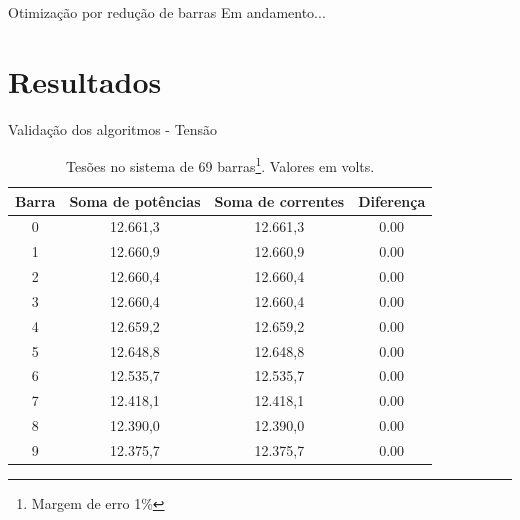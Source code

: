 \documentclass[10pt]{beamer}
\begin{document}
\begin{frame}{Otimização por redução de barras}
    Em andamento...
\end{frame}

\section{Resultados}

\begin{frame}{Validação dos algoritmos - Tensão}
    \begin{table}
        \caption{Tesões no sistema de 69 barras\footnote{Margem de erro 1\%}. Valores em volts.}
        \begin{tabular}{cccc}
            \toprule
            Barra & Soma de potências & Soma de correntes & Diferença \\
            \midrule
            0 & 12.661,3 & 12.661,3 & 0.00 \\
            1 & 12.660,9 & 12.660,9 & 0.00 \\
            2 & 12.660,4 & 12.660,4 & 0.00 \\
            3 & 12.660,4 & 12.660,4 & 0.00 \\
            4 & 12.659,2 & 12.659,2 & 0.00 \\
            5 & 12.648,8 & 12.648,8 & 0.00 \\
            6 & 12.535,7 & 12.535,7 & 0.00 \\
            7 & 12.418,1 & 12.418,1 & 0.00 \\
            8 & 12.390,0 & 12.390,0 & 0.00 \\
            9 & 12.375,7 & 12.375,7 & 0.00 \\
            \bottomrule
        \end{tabular}
    \end{table}
    
\end{frame}
\end{document}
